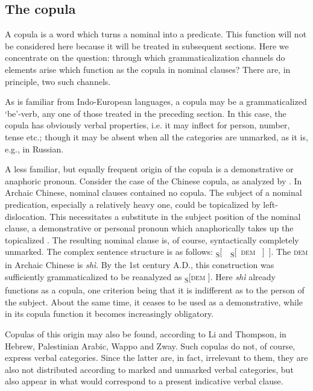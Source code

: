 \subsection{The copula} \label{sec:3.1.2}

A copula is a word which turns a nominal into a predicate. This function will not be considered here because it will be treated in subsequent sections. Here we concentrate on the question: through which grammaticalization channels do elements arise which function as the copula in nominal clauses? There are, in principle, two such channels.

As is familiar from Indo-European languages, a copula may be a grammaticalized ‘be’-verb, any one of those treated in the preceding section. In this case, the copula has obviously verbal properties, i.e. it may inflect for person, number, tense etc.; though it may be absent when all the categories are unmarked, as it is, e.g., in Russian.

A less familiar, but equally frequent origin of the copula is a demonstrative or anaphoric pronoun. Consider the case of the Chinese copula, as analyzed by \citet{LiEtAl1977}. In Archaic Chinese, nominal clauses contained no copula. The subject of a nominal predication, especially a relatively heavy one, could be topicalized by left-dislocation. This necessitates a substitute in the subject position of the nominal clause, a demonstrative or personal pronoun which anaphorically takes up the topicalized \np. The resulting nominal clause is, of course, syntactically completely unmarked. The complex sentence structure is as follows: \textsubscript{S}[~\np~\textsubscript{S}[~\textsc{dem} \np~]~]. The \textsc{dem} in Archaic Chinese is \textit{shì}. By the 1st century A.D., this construction was sufficiently grammaticalized to be reanalyzed as \textsubscript{S}[\np \textsc{dem} \np]. Here \textit{shì} already functions as a copula, one criterion being that it is indifferent as to the person of the subject. About the same time, it ceases to be used as a demonstrative, while in its copula function it becomes increasingly obligatory.

Copulas of this origin may also be found, according to Li and Thompson, in Hebrew, Palestinian Arabic, Wappo and Zway. Such copulas do not, of course, express verbal categories. Since the latter are, in fact, irrelevant to them, they are also not distributed according to marked and unmarked verbal categories, but also appear in what would correspond to a present indicative verbal clause.

